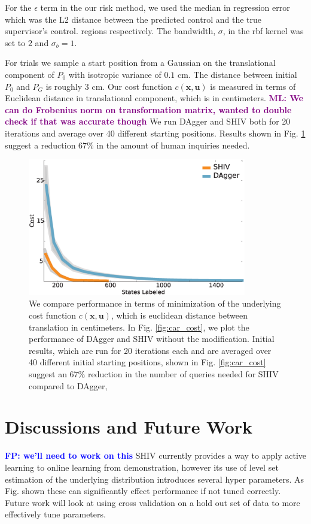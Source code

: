\documentclass[10pt, conference]{ieeeconf}      %
\newcommand{\bu}{\mathbf{u}}
\newcommand{\bx}{\mathbf{x}}
\newcommand{\fpnote}[1]{\ifthenelse{\boolean{include-notes}}%
 {\textcolor{blue}{\textbf{FP: #1}}}{}}
\newcommand{\mlnote}[1]{\ifthenelse{\boolean{include-notes}}%
 {\textcolor{purple}{\textbf{ML: #1}}}{}}
\begin{document}
For the $\epsilon$ term in the our risk method, we used the median in regression error which was the L2 distance between the predicted control and the true supervisor's control. 
regions respectively. The bandwidth, $\sigma$, in the rbf kernel was set to $2$ and $\sigma_b = 1$.

For trials we sample a start position from a Gaussian on the translational component of $P_0$ with isotropic variance of
$0.1$ cm. The distance between initial $P_0$ and $P_G$ is roughly $3$ cm. Our cost function $c(\bx,\bu)$ is measured in
terms of Euclidean distance in translational component, which is in centimeters. \mlnote{We can do Frobenius norm on transformation matrix, wanted to double check if that was accurate though} We run DAgger and SHIV both for 20 iterations and average over 40 different starting positions.
Results shown in Fig. \ref{fig:needle} suggest a reduction $67\%$ in the amount of human inquiries needed. 





\begin{figure}[t!]
\centering
\includegraphics[width=\columnwidth, height=6cm]{figures/needle_insertion_results.eps}
\caption{We compare performance in terms of minimization of the underlying cost function $c(\bx,\bu)$, which is euclidean distance between translation in centimeters. In Fig. \ref{fig:car_cost}, we plot the performance of DAgger and SHIV without the modification.  Initial results, which are run for 20 iterations each and are averaged over 40 different initial starting positions, shown in Fig. \ref{fig:car_cost} suggest an $67\%$ reduction in the number of queries needed for SHIV compared to DAgger,}
\vspace*{-10pt}
\label{fig:needle}
\end{figure}



\section{Discussions and Future Work}
\fpnote{we'll need to work on this}
SHIV currently provides a way to apply active learning to online learning from demonstration, however its use of level set estimation of the underlying distribution introduces several hyper parameters. As Fig. shown these can significantly effect performance if not tuned correctly. Future work will look at using cross validation on a hold out set of data to more effectively tune parameters. 
\end{document}
